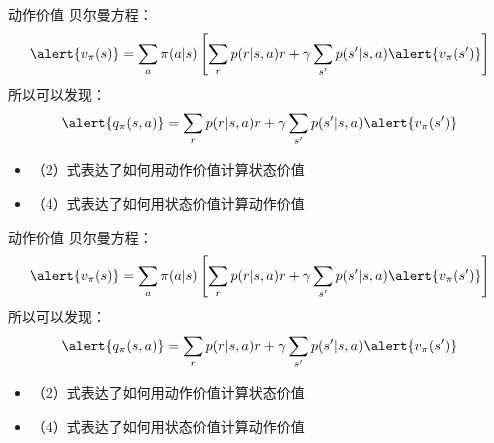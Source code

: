 \documentclass[aspectratio=169,xcolor=dvipsnames]{beamer}
\begin{document}
\begin{frame}{动作价值}
    贝尔曼方程：
    \begin{equation}
        \alert{v_\pi(s)}=\sum_a\pi(a|s)\left[\sum_r p(r|s,a)r+\gamma\sum_{s'}p(s'|s,a)\alert{v_{\pi}(s')}\right]
    \end{equation}
    所以可以发现：
    \begin{equation}
        \alert{q_\pi(s,a)}=\sum_r p(r|s,a)r+\gamma\sum_{s'}p(s'|s,a)\alert{v_{\pi}(s')}
    \end{equation}
    \begin{itemize}
        \item （2）式表达了如何用动作价值计算状态价值
        \item （4）式表达了如何用状态价值计算动作价值
    \end{itemize}
\end{frame}

\begin{frame}{动作价值}
    贝尔曼方程：
    \begin{equation}
        \alert{v_\pi(s)}=\sum_a\pi(a|s)\left[\sum_r p(r|s,a)r+\gamma\sum_{s'}p(s'|s,a)\alert{v_{\pi}(s')}\right]
    \end{equation}
    所以可以发现：
    \begin{equation}
        \alert{q_\pi(s,a)}=\sum_r p(r|s,a)r+\gamma\sum_{s'}p(s'|s,a)\alert{v_{\pi}(s')}
    \end{equation}
    \begin{itemize}
        \item （2）式表达了如何用动作价值计算状态价值
        \item （4）式表达了如何用状态价值计算动作价值
    \end{itemize}
\end{frame}
\end{document}
